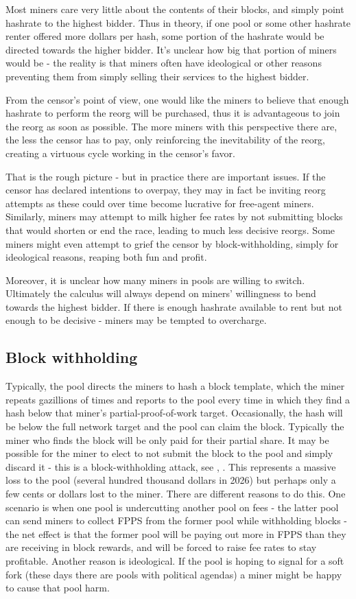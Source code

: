 \documentclass{article}%
\begin{document}
Most miners care very little about the contents of their blocks, and simply
point hashrate to the highest bidder.  Thus in theory, if one pool or some
other hashrate renter offered more dollars per hash, some portion of the hashrate would be
directed towards the higher bidder.  It's unclear how big that portion of miners would be - the
reality is that miners often have ideological or other reasons
preventing them from simply selling their services to the highest bidder.


From the censor's point of view, one would like the miners to
believe that enough hashrate to perform the reorg will be purchased, thus it
is advantageous to join the reorg as soon as possible. The more miners with
this perspective there are, the less the censor has to pay, only reinforcing
the inevitability of the reorg, creating a virtuous cycle working in the
censor's favor.

That is the rough picture - but in practice there are important issues.  If
the censor has declared intentions to overpay, they may in fact be inviting
reorg attempts as these could over time become lucrative for free-agent miners.
 Similarly, miners may attempt to milk higher fee rates by not submitting
blocks that would shorten or end the race, leading to much less decisive
reorgs.  Some miners might even attempt to grief the censor by
block-withholding, simply for ideological reasons, reaping both fun and profit.

Moreover, it is unclear how many miners in pools
are willing to switch. Ultimately the calculus will always depend on miners'
willingness to bend towards the highest bidder.  If there is enough hashrate
available to rent but not enough to be decisive - miners may be tempted to
overcharge.
\subsection{Block withholding\label{withholding}}

Typically, the pool directs the miners to hash a block template, which the miner repeats gazillions of times and reports to the pool every time in which
they find a hash below that miner's partial-proof-of-work target.
 Occasionally, the hash will be below the full network target and the pool can claim
the block.  Typically the miner who finds the block will be
only paid for their partial share.  It may be possible for the miner to elect
to not submit the block to the pool and simply discard it - this is a block-withholding attack, see \cite{Rosenfeld11}, \cite{Eyal15}.  This represents a
massive loss to the pool (several hundred thousand dollars in 2026) but
perhaps only a few cents or dollars lost to the miner.  There are different
reasons to do this.  One scenario is when one pool is undercutting another pool on fees - the latter pool can send miners to collect FPPS from the
former pool while withholding blocks - the net effect is that the former pool
will be paying out more in FPPS than they are receiving in block rewards, and
will be forced to raise fee rates to stay profitable.  Another reason is
ideological.  If the pool is hoping to signal for a soft fork (these days
there are pools with political agendas) a miner might be happy to cause that
pool harm.
\end{document}
